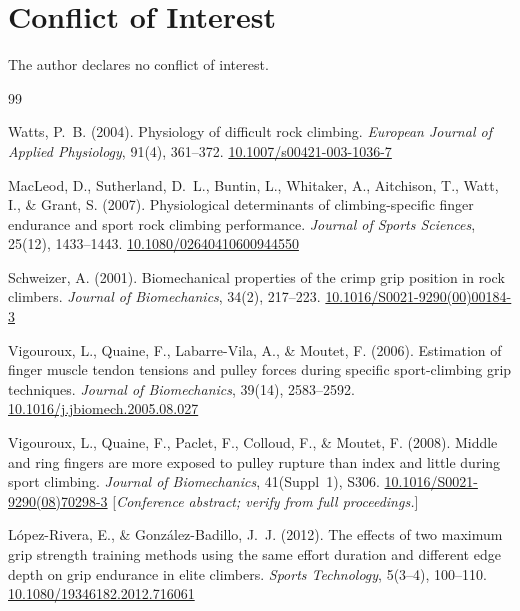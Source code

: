 \documentclass[12pt,a4paper]{article}
\begin{document}
\section*{Conflict of Interest}
The author declares no conflict of interest.

\begin{thebibliography}{99}

Watts, P.~B. (2004).
Physiology of difficult rock climbing.
\textit{European Journal of Applied Physiology}, 91(4), 361--372.
\href{https://doi.org/10.1007/s00421-003-1036-7}{10.1007/s00421-003-1036-7}

MacLeod, D., Sutherland, D.~L., Buntin, L., Whitaker, A., Aitchison, T., Watt, I., \& Grant, S. (2007).
Physiological determinants of climbing-specific finger endurance and sport rock climbing performance.
\textit{Journal of Sports Sciences}, 25(12), 1433--1443.
\href{https://doi.org/10.1080/02640410600944550}{10.1080/02640410600944550}

Schweizer, A. (2001).
Biomechanical properties of the crimp grip position in rock climbers.
\textit{Journal of Biomechanics}, 34(2), 217--223.
\href{https://doi.org/10.1016/S0021-9290(00)00184-3}{10.1016/S0021-9290(00)00184-3}

Vigouroux, L., Quaine, F., Labarre-Vila, A., \& Moutet, F. (2006).
Estimation of finger muscle tendon tensions and pulley forces during specific sport-climbing grip techniques.
\textit{Journal of Biomechanics}, 39(14), 2583--2592.
\href{https://doi.org/10.1016/j.jbiomech.2005.08.027}{10.1016/j.jbiomech.2005.08.027}

Vigouroux, L., Quaine, F., Paclet, F., Colloud, F., \& Moutet, F. (2008).
Middle and ring fingers are more exposed to pulley rupture than index and little during sport climbing.
\textit{Journal of Biomechanics}, 41(Suppl~1), S306.
\href{https://doi.org/10.1016/S0021-9290(08)70298-3}{10.1016/S0021-9290(08)70298-3}
[\textit{Conference abstract; verify from full proceedings.}]

López-Rivera, E., \& González-Badillo, J.~J. (2012).
The effects of two maximum grip strength training methods using the same effort duration and different edge depth on grip endurance in elite climbers.
\textit{Sports Technology}, 5(3--4), 100--110.
\href{https://doi.org/10.1080/19346182.2012.716061}{10.1080/19346182.2012.716061}


\end{thebibliography}
\end{document}

